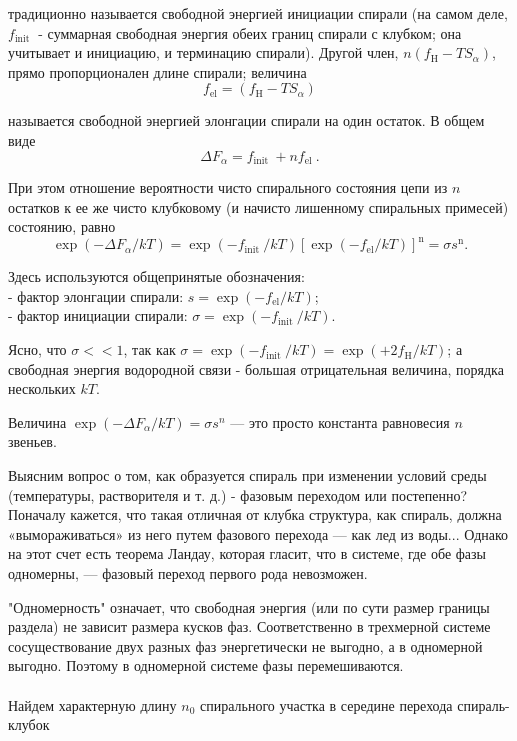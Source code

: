 \documentclass[
11pt,%
tightenlines,%
twoside,%
onecolumn,%
nofloats,%
nobibnotes,%
nofootinbib,%
superscriptaddress,%
noshowpacs,%
centertags]%
{revtex4}
\begin{document}
традиционно называется свободной энергией инициации спирали (на самом деле, $f_{\text {init }}$ - суммарная свободная энергия обеих границ спирали с клубком; она учитывает и инициацию, и терминацию спирали). Другой член, $n\left(f_{\mathrm{H}}-T S_\alpha\right)$, прямо пропорционален длине спирали; величина
\begin{equation}
	f_{\mathrm{el}}=\left(f_{\mathrm{H}}-T S_\alpha\right)
\end{equation}

называется свободной энергией элонгации спирали на один остаток. В общем виде
\begin{equation}
	\Delta F_\alpha=f_{\text {init }}+n f_{\text {el }} .
\end{equation}

При этом отношение вероятности чисто спирального состояния цепи из $n$ остатков к ее же чисто клубковому (и начисто лишенному спиральных примесей) состоянию, равно
\begin{equation}
	\exp \left(-\Delta F_\alpha / k T\right)=\exp \left(-f_{\text {init }} / k T\right)\left[\exp \left(-f_{\mathrm{el}} / k T\right)\right]^{\mathrm{n}}=\sigma s^{\mathrm{n}} .
\end{equation}

Здесь используются общепринятые обозначения:
\\- фактор элонгации спирали: $s=\exp \left(-f_{\mathrm{el}} / k T\right)$;
\\- фактор инициации спирали: $\sigma=\exp \left(-f_{\text {init }} / k T\right)$.

Ясно, что $\sigma<<1$, так как $\sigma=\exp \left(-f_{\text {init }} / k T\right)=\exp \left(+2 f_{\mathrm{H}} / k T\right)$; а свободная энергия водородной связи - большая отрицательная величина, порядка нескольких $k T$.

Величина $\exp \left(-\Delta F_\alpha / k T\right)=\sigma s^n$ — это просто константа равновесия $n$ звеньев.

Выясним вопрос о том, как образуется спираль при изменении условий среды (температуры, растворителя и т. д.) - фазовым переходом или постепенно?
Поначалу кажется, что такая отличная от клубка структура, как спираль, должна «вымораживаться» из него путем фазового перехода — как лед из воды...
Однако на этот счет есть теорема Ландау, которая гласит, что в системе, где обе фазы одномерны, — фазовый переход первого рода невозможен.

"Одномерность" означает, что свободная энергия (или по сути размер границы раздела) не зависит размера кусков фаз. Соответственно в трехмерной системе сосуществование двух разных фаз энергетически не выгодно, а в одномерной выгодно. Поэтому в одномерной системе фазы перемешиваются. 
\\ \\Найдем характерную длину $n_0$ спирального участка в середине перехода спираль-клубок
\end{document}
